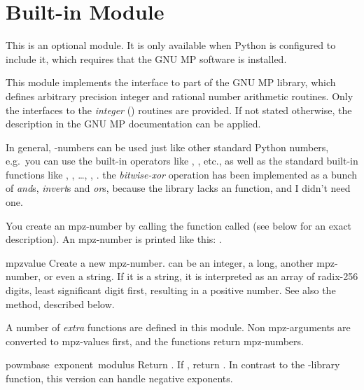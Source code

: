 \section{Built-in Module }

This is an optional module.  It is only available when Python is
configured to include it, which requires that the GNU MP software is
installed.

This module implements the interface to part of the GNU MP library,
which defines arbitrary precision integer and rational number
arithmetic routines.  Only the interfaces to the \emph{integer}
() routines are provided. If not stated
otherwise, the description in the GNU MP documentation can be applied.

In general, -numbers can be used just like other standard
Python numbers, e.g.\ you can use the built-in operators like \code{+},
\code{*}, etc., as well as the standard built-in functions like
, , \ldots, , .
 the {\it bitwise-xor} operation has been implemented as
a bunch of {\it and}s, {\it invert}s and {\it or}s, because the library
lacks an  function, and I didn't need one.

You create an mpz-number by calling the function called  (see
below for an exact description). An mpz-number is printed like this:
.

\renewcommand{\indexsubitem}{(in module mpz)}
\begin{funcdesc}{mpz}{value}
  Create a new mpz-number.  can be an integer, a long,
  another mpz-number, or even a string. If it is a string, it is
  interpreted as an array of radix-256 digits, least significant digit
  first, resulting in a positive number. See also the 
  method, described below.
\end{funcdesc}

A number of {\em extra} functions are defined in this module. Non
mpz-arguments are converted to mpz-values first, and the functions
return mpz-numbers.

\begin{funcdesc}{powm}{base\, exponent\, modulus}
  Return . If
  , return . In contrast to the
  \C-library function, this version can handle negative exponents.
\end{funcdesc}

